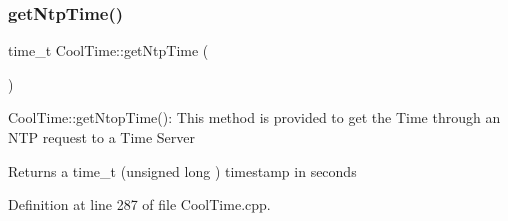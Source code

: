 \subsubsection{\texorpdfstring{get\+Ntp\+Time()}{getNtpTime()}}
{\footnotesize\ttfamily time\+\_\+t Cool\+Time\+::get\+Ntp\+Time (\begin{DoxyParamCaption}{ }\end{DoxyParamCaption})}

Cool\+Time\+::get\+Ntop\+Time()\+: This method is provided to get the Time through an N\+TP request to a Time Server

\begin{DoxyReturn}{Returns}
a time\+\_\+t (unsigned long ) timestamp in seconds 
\end{DoxyReturn}


Definition at line 287 of file Cool\+Time.\+cpp.


